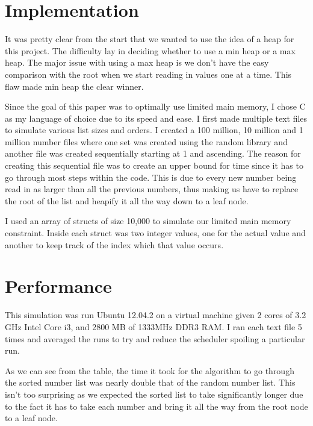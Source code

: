 \documentclass[12pt,letterpaper]{article}
\begin{document}
\section{Implementation}
It was pretty clear from the start that we wanted to use the idea of a heap for this project. The difficulty lay in deciding whether to use a min heap or a max heap. The major issue with using a max heap is we don't have the easy comparison with the root when we start reading in values one at a time. This flaw made min heap the clear winner.

Since the goal of this paper was to optimally use limited main memory, I chose C as my language of choice due to its speed and ease.  I first made multiple text files to simulate various list sizes and orders.  I created a 100 million, 10 million and 1 million number files where one set was created using the random library and another file was created sequentially starting at 1 and ascending. The reason for creating this sequential file was to create an upper bound for time since it has to go through most steps within the code. This is due to every new number being read in as larger than all the previous numbers, thus making us have to replace the root of the list and heapify it all the way down to a leaf node.

I used an array of structs of size 10,000 to simulate our limited main memory constraint. Inside each struct was two integer values, one for the actual value and another to keep track of the index which that value occurs.






\section{Performance}
This simulation was run  Ubuntu 12.04.2 on a virtual machine given 2 cores of 3.2 GHz Intel Core i3, and 2800 MB of 1333MHz DDR3 RAM. I ran each text file 5 times and averaged the runs to try and reduce the scheduler spoiling a particular run.

As we can see from the table, the time it took for the algorithm to go through the sorted number list was nearly double that of the random number list. This isn't too surprising as we expected the sorted list to take significantly longer due to the fact it has to take each number and bring it all the way from the root node to a leaf node.
\end{document}
